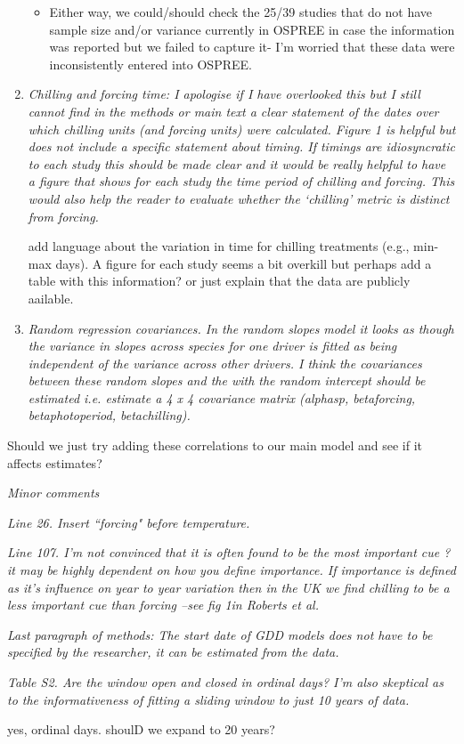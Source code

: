 \documentclass[11pt, a4paper]{article}
\begin{document}
\begin{enumerate}
\begin{itemize}
\item Either way, we could/should check the 25/39 studies that do not have sample size and/or variance currently in OSPREE in case the information was reported but we failed to capture it- I'm worried that these data were inconsistently entered into OSPREE. 
\end{itemize}
\item \emph{Chilling and forcing time: I apologise if I have overlooked this but I still cannot find in the
methods or main text a clear statement of the dates over which chilling units (and forcing
units) were calculated. Figure 1 is helpful but does not include a specific statement about
timing. If timings are idiosyncratic to each study this should be made clear and it would be
really helpful to have a figure that shows for each study the time period of chilling and forcing.
This would also help the reader to evaluate whether the `chilling' metric is distinct from
forcing.}
\par add language about the variation in time for chilling treatments (e.g., min-max days). A figure for each study seems a bit overkill but perhaps add a table with this information? or just explain that the data are publicly aailable.

\item \emph{Random regression covariances. In the random slopes model it looks as though the variance in
slopes across species for one driver is fitted as being independent of the variance across other
drivers. I think the covariances between these random slopes and the with the random
intercept should be estimated i.e. estimate a 4 x 4 covariance matrix (alphasp, betaforcing,
betaphotoperiod, betachilling).}
\end{enumerate}
\par Should we just try adding these correlations to our main model and see if it affects estimates?

\par \emph{Minor comments}
\par \emph{Line 26. Insert ``forcing" before temperature.}
\par \emph{Line 107. I'm not convinced that it is often found to be the most important cue ? it may be highly
dependent on how you define importance. If importance is defined as it's influence on year to year
variation then in the UK we find chilling to be a less important cue than forcing --see fig 1in Roberts et
al.}
\par \emph{Last paragraph of methods: The start date of GDD models does not have to be specified by the
researcher, it can be estimated from the data.}
\par \emph{Table S2. Are the window open and closed in ordinal days? I'm also skeptical as to the informativeness
of fitting a sliding window to just 10 years of data.}
\par yes, ordinal days. shoulD we expand to 20 years?
\end{document}
